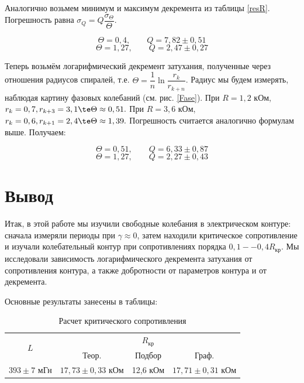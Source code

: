 \documentclass[12pt]{kiarticle}
\begin{document}
Аналогично возьмем минимум и максимум декремента из таблицы \ref{resR}. Погрешность равна $ \sigma_Q = Q \dfrac{\sigma_\Theta}{\Theta} $. 

\begin{equation}\label{}
\Theta = 0,4 ,\qquad Q = 7,82 \pm 0,51
\end{equation}
\begin{equation}\label{}
\Theta = 1,27 ,\qquad Q = 2,47 \pm 0,27
\end{equation}

Теперь возьмём логарифмический декремент затухания, полученные через отношения радиусов спиралей, т.е. $ \Theta =  \dfrac{1}{n} \ln \dfrac{r_k}{r_{k+n}}$. Радиус мы будем измерять, наблюдая картину фазовых колебаний (см. рис. \ref{Fase}). При $ R = 1,2  $ кОм, $ r_k = 0,7, r_{k+3} = 3,1 \te \Theta \approx 0,51. $ При $ R = 3,6  $ кОм, $ r_k = 0,6, r_{k+1} = 2,4 \te \Theta \approx 1,39.$ Погрешность считается аналогично формулам выше. Получаем:

\begin{equation}\label{}
\Theta = 0,51 ,\qquad Q = 6,33 \pm 0,87
\end{equation}
\begin{equation}\label{}
\Theta = 1,27 ,\qquad Q = 2,27 \pm 0,43
\end{equation}


\section{Вывод}

Итак, в этой работе мы изучили свободные колебания в электрическом контуре: сначала измеряли периоды при $ \gamma \approx 0 $, затем находили критическое сопротивление и изучали колебательный контур при сопротивлениях порядка $ 0,1 -- 0,4 R_{кр} $. Мы исследовали зависимость логарифмического декремента затухания от сопротивления контура, а также добротности от параметров контура и от декремента. 

Основные результаты занесены в таблицы:
\begin{table}[h!]%
	\centering
	\caption{Расчет критического сопротивления }
	\begin{tabular}{|c|c|c|c|}
		\hline
		\multirow{2}{*}{$  L $} & \multicolumn{3}{|c|}{$ R_{кр} $} \\
		\cline{2-4}
		& Теор. & Подбор & Граф.  \\
		\hline
		$ 393 \pm  7 $ мГн   & $ 17,73 \pm 0,33 $ кОм & 12,6 кОм & 	$ 17,71 \pm 0,31 $ кОм \\
		\hline
	\end{tabular}
\end{table}
\end{document}
